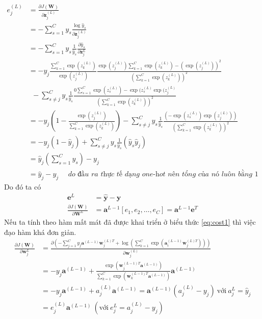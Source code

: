 \begin{equation}
\begin{split}
e_j^{(L)} &= \frac{\partial J(\textbf{W}) }{\partial \textbf{z}_j^{(L)}} \\
&=-\sum^{C}_{s=1} y_{s}\frac{ \log \widehat{y}_{s}}{\partial \textbf{z}_j^{(L)}} \\
&=-\sum^{C}_{s=1} y_s \frac{1}{\widehat{y}_s}\frac{\partial \widehat{y}_s}{\partial \textbf{z}^L_j}\\
& = - y_{j}\frac{\sum^C_{k=1}\exp{(z^{(L)}_k)}}{\exp{(z^{(L)}_j)}} \frac{\exp(z^{(L)}_j) \sum^C_{k=1}\exp(z^{(L)}_k) - (\exp(z^{(L)}_{j}))^2}{\left(\sum^C_{k=1}\exp(z^{(L)}_k)\right)^2}\\
&~~ - \sum^C_{s\neq j} y_s \frac{1}{\widehat{y}_s}  \frac{0\sum^C_{s=1}\exp(z^{(L)}_s) - \exp(z^{(L)}_{s}\exp(z^{(L)}_{j}} {\left(\sum^C_{k=1}\exp(z^{(L)}_k)\right)^2}\\
&= -y_{j}\left(1-\frac{\exp(z^{(L)}_j)}{\sum^C_{k=1}\exp(z^{(L)}_k)}\right) - \sum^C_{s\neq j} y_s \frac{1}{\widehat{y}_s}\frac{\left(-\exp(z^{(L)}_{s})\exp(z^{(L)}_{j})\right)} {\left(\sum^C_{k=1}\exp(z^{(L)}_k)\right)^2} \\
& = -y_{j} \left( 1-\widehat{y}_j \right) +  \sum^C_{s\neq j}y_s \frac{1}{\widehat{y}_s}	(\widehat{y}_s	\widehat{y}_j)\\
& = \widehat{y}_j\left(\sum_{s=1}^C   y_s\right) -y_{j}\\
& = \widehat{y}_j - y_j ~~~~~~\textit{do đầu ra thực tế dạng one-hot nên tổng của nó luôn bằng 1}
\end{split}
\end{equation}
Do đó ta có
\begin{equation}
\label{eq:back_gra1}
\begin{split}
\textbf{e}^{L} & = \widehat{\textbf{y}} - \textbf{y}\\
\frac{\partial J(\textbf{W})}{\partial \textbf{W}^{L}}& = \textbf{a}^{L-1}[e_1,e_2,\ldots,e_C]=\textbf{a}^{L-1}\textbf{e}^{T}
\end{split}
\end{equation}
Nếu ta tính theo hàm mất mát đã được khai triển ở biểu thức \ref{eq:cost1} thì việc đạo hàm khá đơn giản.
\begin{equation}
\begin{split}
\frac{\partial J(\textbf{W})}{\partial \textbf{w}^{L}_j}  
&=\frac{\partial \left( -\sum_{j=1}^C y_{j} \textbf{a}^{(L-1)}\textbf{w}^{(L)T}_{j} + \log\left(\sum_{k=1}^C \exp(\textbf{a}^{(L-1)}_i\textbf{w}^{(L)T}_{j})\right) \right)}{\partial \textbf{w}^{(L)}_j}\\
&=-y_{j}\textbf{a}^{(L-1)} + 
\frac{\exp(\textbf{w}_j^{(L-1)T}\textbf{a}^{(L-1)})}{\sum_{k = 1}^C \exp(\textbf{w}_k^{(L-1)T}\textbf{a}^{(L-1)})}\textbf{a}^{(L-1)} \\
&= -y_{j}\textbf{a}^{(L-1)} + a^{(L)}_{j} \textbf{a}^{(L-1)}= \textbf{a}^{(L-1)} (a^{(L)}_{j} - y_{j})~ \text{với} ~a_j^{L} = \widehat{y}_j \\
&= e^{(L)}_{j}\textbf{a}^{(L-1)} ~(\text{với}~ e^{L}_{j} = a^{(L)}_{j} - y_{j})
\end{split}
\end{equation} 
